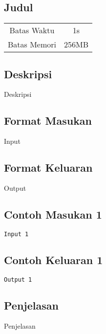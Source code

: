 \documentclass{article}
\begin{document}
\begin{center}

    
    \section*{Judul} %

    \begin{tabular}{ | c c | }
        \hline
        Batas Waktu  & 1s \\    %
        Batas Memori & 256MB \\  %
        \hline
    \end{tabular}
\end{center}

\subsection*{Deskripsi}

Deskripsi

\subsection*{Format Masukan}

Input

\subsection*{Format Keluaran}

Output

\begin{multicols}{2}
\subsection*{Contoh Masukan 1}
\begin{lstlisting}
Input 1
\end{lstlisting}
\columnbreak
\subsection*{Contoh Keluaran 1}
\begin{lstlisting}
Output 1
\end{lstlisting}
\vfill
\null
\end{multicols}


\subsection*{Penjelasan}

Penjelasan
\end{document}
